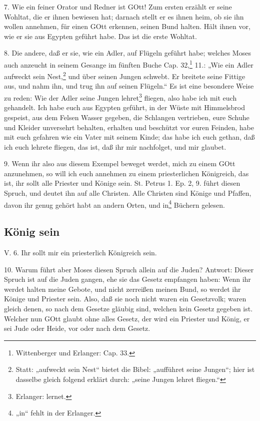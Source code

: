 7. Wie ein feiner Orator und Redner ist GOtt! Zum ersten erzählt er seine Wohltat, die er ihnen bewiesen hat; darnach stellt er es ihnen heim, ob sie ihn wollen annehmen, für einen GOtt erkennen, seinen Bund halten. Hält ihnen vor, wie er sie aus Egypten geführt habe. Das ist die erste Wohltat.

8. Die andere, daß er sie, wie ein Adler, auf Flügeln geführt habe; welches Moses auch anzeucht in seinem Gesange im fünften Buche Cap. 32,\footnote{Wittenberger und Erlanger: Cap. 33.} 11.: „Wie ein Adler aufweckt sein Nest,\footnote{Statt: „aufweckt sein Nest“ bietet die Bibel: „aufführet seine Jungen“; hier ist dasselbe gleich folgend erklärt durch: „seine Jungen lehret fliegen.“} und über seinen Jungen schwebt. Er breitete seine Fittige aus, und nahm ihn, und trug ihn auf seinen Flügeln.“ Es ist eine besondere Weise zu reden: Wie der Adler seine Jungen lehret\footnote{Erlanger: lernet.} fliegen, also habe ich mit euch gehandelt. Ich habe euch aus Egypten geführt, in der Wüste mit Himmelsbrod gespeist, aus dem Felsen Wasser gegeben, die Schlangen vertrieben, eure Schuhe und Kleider unversehrt behalten, erhalten und beschützt vor euren Feinden, habe mit euch gefahren wie ein Vater mit seinem Kinde; das habe ich euch gethan, daß ich euch lehrete fliegen, das ist, daß ihr mir nachfolget, und mir glaubet.

9. Wenn ihr also aus diesem Exempel beweget werdet, mich zu einem GOtt anzunehmen, so will ich euch annehmen zu einem priesterlichen Königreich, das ist, ihr sollt alle Priester und Könige sein. St. Petrus 1. Ep. 2, 9. führt diesen Spruch, und deutet ihn auf alle Christen. Alle Christen sind Könige und Pfaffen, davon ihr genug gehört habt an andern Orten, und in\footnote{„in“ fehlt in der Erlanger.} Büchern gelesen.

\subsection{König sein}

\begin{schriftzitat}
V. 6. Ihr sollt mir ein priesterlich Königreich sein.
\end{schriftzitat}

10. Warum führt aber Moses diesen Spruch allein auf die Juden? Antwort: Dieser Spruch ist auf die Juden gangen, ehe sie das Gesetz empfangen haben: Wenn ihr werdet halten meine Gebote, und nicht zerreißen meinen Bund, so werdet ihr Könige und Priester sein. Also, daß sie noch nicht waren ein Gesetzvolk; waren gleich denen, so nach dem Gesetze gläubig sind, welchen kein Gesetz gegeben ist. Welcher nun GOtt glaubt ohne alles Gesetz, der wird ein Priester und König, er sei Jude oder Heide, vor oder nach dem Gesetz.

